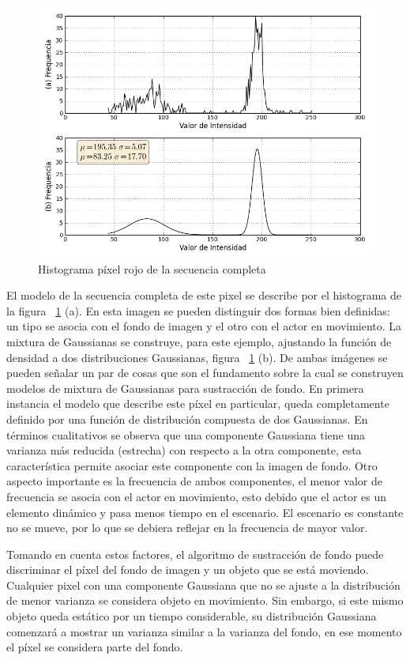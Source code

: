 \begin{figure}[h!]
  \centering
      \includegraphics[scale=0.75]{img/histograma_pixel_340_160_3_2}
  \caption[Histograma píxel rojo]{Histograma píxel rojo de la secuencia completa}
\label{histograma}
\end{figure}


El modelo de la secuencia completa de este pixel se describe por el histograma de la figura ~\ref{histograma} (a). En esta imagen se pueden distinguir dos formas bien definidas: un tipo se asocia con el fondo de imagen y el otro con el actor en movimiento. La mixtura de Gaussianas se construye, para este ejemplo, ajustando la función de densidad a dos distribuciones Gaussianas, figura ~\ref{histograma} (b). De ambas imágenes se pueden señalar un par de cosas que son el fundamento sobre la cual se construyen modelos de mixtura de Gaussianas para sustracción de fondo. En primera instancia el modelo que describe este píxel en particular, queda completamente definido por una función de distribución compuesta de dos Gaussianas. En términos cualitativos se observa que una componente Gaussiana tiene una varianza más reducida (estrecha) con respecto a la otra componente, esta característica permite asociar este componente con la imagen de fondo. Otro aspecto importante es la frecuencia de ambos componentes, el menor valor de frecuencia se asocia con el actor en movimiento, esto debido que el actor es un elemento dinámico y pasa menos tiempo en el escenario. El escenario es constante no se mueve, por lo que se debiera reflejar en la frecuencia de mayor valor.

Tomando en cuenta estos factores, el algoritmo de sustracción de fondo puede discriminar el píxel del fondo de imagen y un objeto que se está moviendo. Cualquier pixel con una componente Gaussiana que no se ajuste a la distribución de menor varianza se considera objeto en movimiento. Sin embargo, si este mismo objeto queda estático por un tiempo considerable, su distribución Gaussiana comenzará a mostrar un varianza similar a la varianza del fondo, en ese momento el píxel se considera parte del fondo.






